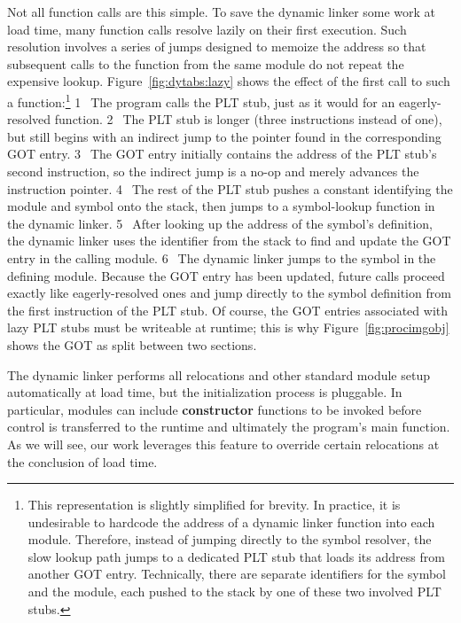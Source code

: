 Not all function calls are this simple.  To save the dynamic linker some work at load
time, many function calls resolve lazily on their first execution.  Such resolution
involves a series of jumps designed to memoize the address so that subsequent calls
to the function from the same module do not repeat the expensive lookup.
Figure~\ref{fig:dytabs:lazy} shows the effect of the first call to such a
function:\footnote{This representation is slightly simplified for brevity.  In
practice, it is undesirable to hardcode the address of a dynamic linker function into
each module.  Therefore, instead of jumping directly to the symbol resolver, the slow
lookup path jumps to a dedicated PLT stub that loads its address from another GOT
entry.  Technically, there are separate identifiers for the symbol and the module,
each pushed to the stack by one of these two involved PLT stubs.}
\textcircled{1}~The
program calls the PLT stub, just as it would for an eagerly-resolved function.
\textcircled{2}~The PLT stub is longer (three instructions instead of one), but still
begins with an indirect jump to the pointer found in the corresponding GOT entry.
\textcircled{3}~The GOT entry initially contains the address of the PLT stub's second
instruction, so the indirect jump is a no-op and merely advances the instruction
pointer.  \textcircled{4}~The rest of the PLT stub pushes a constant identifying the
module and symbol onto the stack, then jumps to a symbol-lookup function in the
dynamic linker.  \textcircled{5}~After looking up the address of the symbol's
definition, the dynamic linker uses the identifier from the stack to find and update
the GOT entry in the calling module.  \textcircled{6}~The dynamic linker jumps to the
symbol in the defining module.  Because the GOT entry has been updated, future calls
proceed exactly like eagerly-resolved ones and jump directly to the symbol definition
from the first instruction of the PLT stub.  Of course, the GOT entries associated
with lazy PLT stubs must be writeable at runtime; this is why
Figure~\ref{fig:procimgobj} shows the GOT as split between two sections.

The dynamic linker performs all relocations and other standard module setup
automatically at load time, but the initialization process is pluggable.  In
particular, modules can include \textbf{constructor} functions to be invoked before
control is transferred to the runtime and ultimately the program's main function.  As
we will see, our work leverages this feature to override certain relocations at the
conclusion of load time.


